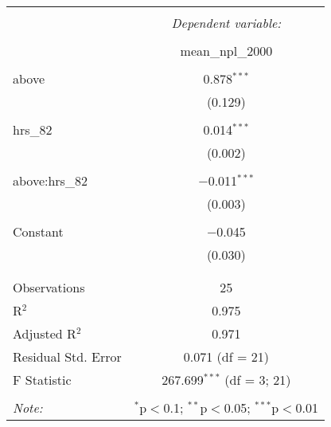 
\begin{table}[!htbp] \centering 
  \caption{} 
  \label{} 
\begin{tabular}{@{\extracolsep{5pt}}lc} 
\\[-1.8ex]\hline 
\hline \\[-1.8ex] 
 & \multicolumn{1}{c}{\textit{Dependent variable:}} \\ 
\cline{2-2} 
\\[-1.8ex] & mean\_npl\_2000 \\ 
\hline \\[-1.8ex] 
 above & 0.878$^{***}$ \\ 
  & (0.129) \\ 
  & \\ 
 hrs\_82 & 0.014$^{***}$ \\ 
  & (0.002) \\ 
  & \\ 
 above:hrs\_82 & $-$0.011$^{***}$ \\ 
  & (0.003) \\ 
  & \\ 
 Constant & $-$0.045 \\ 
  & (0.030) \\ 
  & \\ 
\hline \\[-1.8ex] 
Observations & 25 \\ 
R$^{2}$ & 0.975 \\ 
Adjusted R$^{2}$ & 0.971 \\ 
Residual Std. Error & 0.071 (df = 21) \\ 
F Statistic & 267.699$^{***}$ (df = 3; 21) \\ 
\hline 
\hline \\[-1.8ex] 
\textit{Note:}  & \multicolumn{1}{r}{$^{*}$p$<$0.1; $^{**}$p$<$0.05; $^{***}$p$<$0.01} \\ 
\end{tabular} 
\end{table} 

